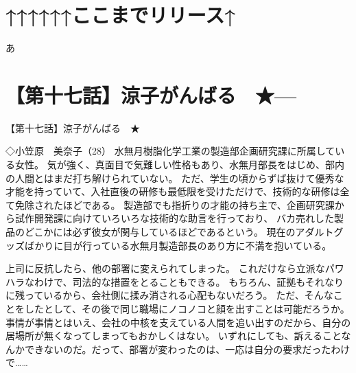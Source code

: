 \section{↑↑↑↑↑↑ここまでリリース↑}
あ

\section{【第十七話】涼子がんばる　★---}
【第十七話】涼子がんばる　★

◇小笠原　美奈子（28）
水無月樹脂化学工業の製造部企画研究課に所属している女性。
気が強く、真面目で気難しい性格もあり、水無月部長をはじめ、部内の人間とはまだ打ち解けられていない。
ただ、学生の頃からずば抜けて優秀な才能を持っていて、入社直後の研修も最低限を受けただけで、技術的な研修は全て免除されたほどである。
製造部でも指折りの才能の持ち主で、企画研究課から試作開発課に向けていろいろな技術的な助言を行っており、
バカ売れした製品のどこかには必ず彼女が関与しているほどであるという。
現在のアダルトグッズばかりに目が行っている水無月製造部長のあり方に不満を抱いている。



上司に反抗したら、他の部署に変えられてしまった。
これだけなら立派なパワハラなわけで、司法的な措置をとることもできる。
もちろん、証拠もそれなりに残っているから、会社側に揉み消される心配もないだろう。
ただ、そんなことをしたとして、その後で同じ職場にノコノコと顔を出すことは可能だろうか。
事情が事情とはいえ、会社の中核を支えている人間を追い出すのだから、自分の居場所が無くなってしまってもおかしくはない。
いずれにしても、訴えることなんかできないのだ。だって、部署が変わったのは、一応は自分の要求だったわけで……

